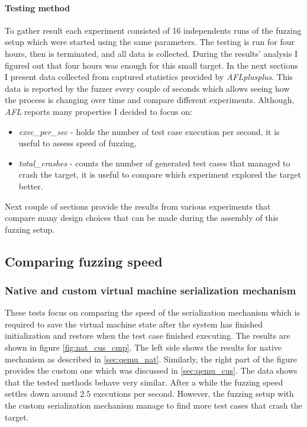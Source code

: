 \paragraph{Testing method}
To gather result each experiment consisted of 16 independents runs of the fuzzing setup which were started using the same parameters. The testing is run for four hours, then is terminated, and all data is collected. During the results' analysis I figured out that four hours was enough for this small target. In the next sections I present data collected from captured statistics provided by \textit{AFLplusplus}. This data is reported by the fuzzer every couple of seconds which allows seeing how the process is changing over time and compare different experiments. Although, \textit{AFL} reports many properties I decided to focus on:
\begin{itemize}
    \item \textit{exec\_per\_sec} - holds the number of test case execution per second, it is useful to assess speed of fuzzing,
    \item \textit{total\_crashes} - counts the number of generated test cases that managed to crash the target, it is useful to compare which experiment explored the target better.
\end{itemize}
Next couple of sections provide the results from various experiments that compare many design choices that can be made during the assembly of this fuzzing setup.

\subsection{Comparing fuzzing speed}

\subsubsection{Native and custom virtual machine serialization mechanism}

These tests focus on comparing the speed of the serialization mechanism which is required to save the virtual machine state after the system has finished initialization and restore when the test case finished executing. The results are shown in figure \ref{fig:nat_cus_cmp}. The left side shows the results for native mechanism as described in \ref{sec:qemu_nat}. Similarly, the right part of the figure provides the custom one which was discussed in \ref{sec:qemu_cus}. The data shows that the tested methods behave very similar. After a while the fuzzing speed settles down around $2.5$ executions per second. However, the fuzzing setup with the custom serialization mechanism manage to find more test cases that crash the target.

